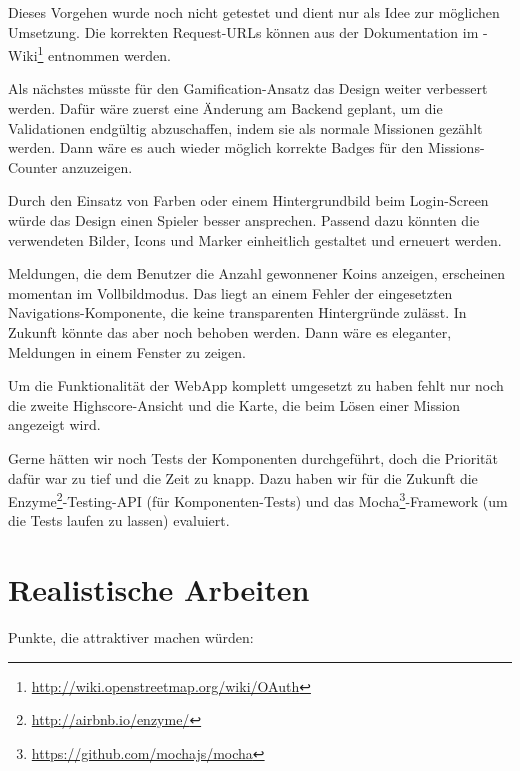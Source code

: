 Dieses Vorgehen wurde noch nicht getestet und dient nur als Idee zur möglichen Umsetzung.
Die korrekten Request-URLs können aus der Dokumentation im -Wiki\footnote{\url{http://wiki.openstreetmap.org/wiki/OAuth}} entnommen werden.

Als nächstes müsste für den \gls{Gamification}-Ansatz das Design weiter verbessert werden. 
Dafür wäre zuerst eine Änderung am Backend geplant, um die Validationen endgültig abzuschaffen, indem sie als normale Missionen gezählt werden. 
Dann wäre es auch wieder möglich korrekte Badges für den Missions-Counter anzuzeigen. 

Durch den Einsatz von Farben oder einem Hintergrundbild beim Login-Screen würde das Design einen Spieler besser ansprechen.  
Passend dazu könnten die verwendeten Bilder, Icons und Marker einheitlich gestaltet und erneuert werden. 

Meldungen, die dem Benutzer die Anzahl gewonnener Koins anzeigen, erscheinen momentan im Vollbildmodus. 
Das liegt an einem Fehler der eingesetzten Navigations-Komponente, die keine transparenten Hintergründe zulässt. 
In Zukunft könnte das aber noch behoben werden. 
Dann wäre es eleganter, Meldungen in einem Fenster zu zeigen.

Um die Funktionalität der \gls{WebApp} komplett umgesetzt zu haben fehlt nur noch die zweite Highscore-Ansicht und die Karte, die beim Lösen einer Mission angezeigt wird.

Gerne hätten wir noch Tests der Komponenten durchgeführt, doch die Priorität dafür war zu tief und die Zeit zu knapp. 
Dazu haben wir für die Zukunft die Enzyme\footnote{\url{http://airbnb.io/enzyme/}}-Testing-API (für Komponenten-Tests) und das Mocha\footnote{\url{https://github.com/mochajs/mocha}}-\gls{Framework} (um die Tests laufen zu lassen) evaluiert.

\section{Realistische Arbeiten}
\label{pd-weiterentwicklung-realistisch}
Punkte, die \kort{} attraktiver machen würden:

